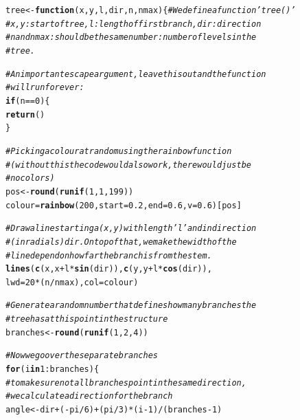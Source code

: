 \documentclass{article}\usepackage[]{graphicx}\usepackage[]{color}
\makeatletter
\newcommand{\hlnum}[1]{\textcolor[rgb]{0.686,0.059,0.569}{#1}}%
\newcommand{\hlcom}[1]{\textcolor[rgb]{0.678,0.584,0.686}{\textit{#1}}}%
\newcommand{\hlopt}[1]{\textcolor[rgb]{0,0,0}{#1}}%
\newcommand{\hlstd}[1]{\textcolor[rgb]{0.345,0.345,0.345}{#1}}%
\newcommand{\hlkwa}[1]{\textcolor[rgb]{0.161,0.373,0.58}{\textbf{#1}}}%
\newcommand{\hlkwb}[1]{\textcolor[rgb]{0.69,0.353,0.396}{#1}}%
\newcommand{\hlkwc}[1]{\textcolor[rgb]{0.333,0.667,0.333}{#1}}%
\newcommand{\hlkwd}[1]{\textcolor[rgb]{0.737,0.353,0.396}{\textbf{#1}}}%
\newenvironment{kframe}{%
 \def\at@end@of@kframe{}%
 \ifinner\ifhmode%
  \def\at@end@of@kframe{\end{minipage}}%
  \begin{minipage}{\columnwidth}%
 \fi\fi%
 \def\FrameCommand##1{\hskip\@totalleftmargin \hskip-\fboxsep
 \colorbox{shadecolor}{##1}\hskip-\fboxsep
     \hskip-\linewidth \hskip-\@totalleftmargin \hskip\columnwidth}%
 \MakeFramed {\advance\hsize-\width
   \@totalleftmargin\z@ \linewidth\hsize
   \@setminipage}}%
 {\par\unskip\endMakeFramed%
 \at@end@of@kframe}
\newenvironment{knitrout}{}{} %
\makeatother
\begin{document}
\begin{knitrout}
\color{fgcolor}\begin{kframe}
\begin{alltt}
\hlstd{tree}\hlkwb{<-}\hlkwa{function}\hlstd{(}\hlkwc{x}\hlstd{,}\hlkwc{y}\hlstd{,}\hlkwc{l}\hlstd{,}\hlkwc{dir}\hlstd{,}\hlkwc{n}\hlstd{,}\hlkwc{nmax}\hlstd{)\{} \hlcom{# We define a function 'tree()'}
  \hlcom{# x,y: start of tree, l: length of first branch, dir: direction}
  \hlcom{# n and nmax: should be the same number: number of levels in the}
  \hlcom{# tree.}

  \hlcom{# An important escape argument, leave this out and the function}
  \hlcom{# will run forever:}
  \hlkwa{if}\hlstd{(n}\hlopt{==}\hlnum{0}\hlstd{)\{}
    \hlkwd{return}\hlstd{()}
  \hlstd{\}}

  \hlcom{# Picking a colour at random using the rainbow function}
  \hlcom{# (without this the code would also work, there would just be}
  \hlcom{# no colors)}
  \hlstd{pos}\hlkwb{<-}\hlkwd{round}\hlstd{(}\hlkwd{runif}\hlstd{(}\hlnum{1}\hlstd{,}\hlnum{1}\hlstd{,}\hlnum{199}\hlstd{))}
  \hlstd{colour}\hlkwb{=}\hlkwd{rainbow}\hlstd{(}\hlnum{200}\hlstd{,}\hlkwc{start}\hlstd{=}\hlnum{0.2}\hlstd{,}\hlkwc{end}\hlstd{=}\hlnum{0.6}\hlstd{,}\hlkwc{v}\hlstd{=}\hlnum{0.6}\hlstd{)[pos]}

  \hlcom{# Draw a line starting a (x,y) with length 'l' and in direction}
  \hlcom{# (in radials) dir. On top of that, we make the width of the }
  \hlcom{# line depend on how far the branch is from the stem.}
  \hlkwd{lines}\hlstd{(}\hlkwd{c}\hlstd{(x,x}\hlopt{+}\hlstd{l}\hlopt{*}\hlkwd{sin}\hlstd{(dir)),}\hlkwd{c}\hlstd{(y,y}\hlopt{+}\hlstd{l}\hlopt{*}\hlkwd{cos}\hlstd{(dir)),}
        \hlkwc{lwd}\hlstd{=}\hlnum{20}\hlopt{*}\hlstd{(n}\hlopt{/}\hlstd{nmax),}\hlkwc{col}\hlstd{=colour)}

  \hlcom{# Generate a random number that defines how many branches the }
  \hlcom{# tree has at this point in the structure}
  \hlstd{branches}\hlkwb{<-}\hlkwd{round}\hlstd{(}\hlkwd{runif}\hlstd{(}\hlnum{1}\hlstd{,}\hlnum{2}\hlstd{,}\hlnum{4}\hlstd{))}

  \hlcom{# Now we go over the separate branches}
  \hlkwa{for}\hlstd{(i} \hlkwa{in} \hlnum{1}\hlopt{:}\hlstd{branches)\{}
    \hlcom{# to make sure not all branches point in the same direction,}
    \hlcom{# we calculate a direction for the branch}
    \hlstd{angle}\hlkwb{<-}\hlstd{dir}\hlopt{+}\hlstd{(}\hlopt{-}\hlstd{pi}\hlopt{/}\hlnum{6}\hlstd{)}\hlopt{+}\hlstd{(pi}\hlopt{/}\hlnum{3}\hlstd{)}\hlopt{*}\hlstd{(i}\hlopt{-}\hlnum{1}\hlstd{)}\hlopt{/}\hlstd{(branches}\hlopt{-}\hlnum{1}\hlstd{)}


\end{alltt}
\end{kframe}
\end{knitrout}
\end{document}
